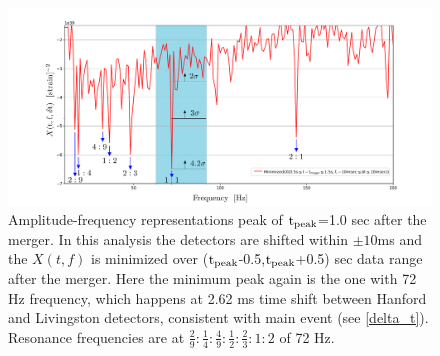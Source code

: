 \documentclass[a4paper,11pt]{article}
\begin{document}
\begin{enumerate}
\begin{figure}[!tbp]
    \includegraphics[width=1\textwidth]{Detector_time_shift_peak_distribution_05_sec_a.pdf}
 \caption{Amplitude-frequency representations peak of $\rm{t_{peak}}$=1.0 sec after the merger. In this analysis the detectors are shifted within $\pm 10$ms and the $X(t,f)$ is minimized over ($\rm{t_{peak}}$-0.5,$\rm{t_{peak}}$+0.5) sec data range after the merger. Here the minimum peak again is the one with 72 Hz frequency, which happens at 2.62 ms time  shift between Hanford and Livingston detectors, consistent with main event (see \ref{delta_t}). Resonance frequencies are at $\frac{2}{9}:\frac{1}{4}:\frac{4}{9}:\frac{1}{2}:\frac{2}{3}:1:2$ of 72 Hz.}
 \label{NS-NS_7}
\end{figure}




\end{enumerate}
\end{document}
